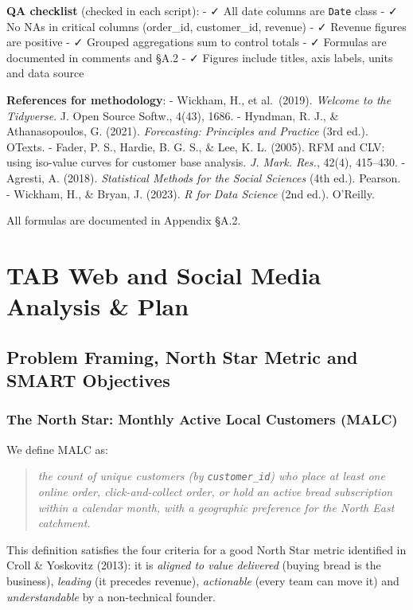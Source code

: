 \documentclass[
  11pt,
]{article}
\begin{document}
\textbf{QA checklist} (checked in each script): - ✓ All date columns are
\texttt{Date} class - ✓ No NAs in critical columns (order\_id,
customer\_id, revenue) - ✓ Revenue figures are positive - ✓ Grouped
aggregations sum to control totals - ✓ Formulas are documented in
comments and §A.2 - ✓ Figures include titles, axis labels, units and
data source

\textbf{References for methodology}: - Wickham, H., et al.~(2019).
\emph{Welcome to the Tidyverse}. J. Open Source Softw., 4(43), 1686. -
Hyndman, R. J., \& Athanasopoulos, G. (2021). \emph{Forecasting:
Principles and Practice} (3rd ed.). OTexts. - Fader, P. S., Hardie, B.
G. S., \& Lee, K. L. (2005). RFM and CLV: using iso-value curves for
customer base analysis. \emph{J. Mark. Res.}, 42(4), 415--430. -
Agresti, A. (2018). \emph{Statistical Methods for the Social Sciences}
(4th ed.). Pearson. - Wickham, H., \& Bryan, J. (2023). \emph{R for Data
Science} (2nd ed.). O'Reilly.

All formulas are documented in Appendix §A.2.

\newpage

\section{TAB Web and Social Media Analysis \&
Plan}\label{tab-web-and-social-media-analysis-plan}

\subsection{Problem Framing, North Star Metric and SMART
Objectives}\label{problem-framing-north-star-metric-and-smart-objectives}

\subsubsection{The North Star: Monthly Active Local Customers
(MALC)}\label{the-north-star-monthly-active-local-customers-malc}

We define MALC as:

\begin{quote}
\emph{the count of unique customers (by \texttt{customer\_id}) who place
at least one online order, click-and-collect order, or hold an active
bread subscription within a calendar month, with a geographic preference
for the North East catchment.}
\end{quote}

This definition satisfies the four criteria for a good North Star metric
identified in Croll \& Yoskovitz (2013): it is \emph{aligned to value
delivered} (buying bread is the business), \emph{leading} (it precedes
revenue), \emph{actionable} (every team can move it) and
\emph{understandable} by a non-technical founder.
\end{document}
